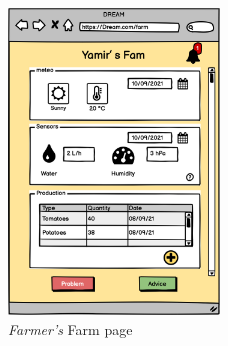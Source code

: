 \begin{figure}[H]
    \begin{center}
    \includegraphics[width=0.5\textwidth]{mockups/FFarm.png}
    \caption{\emph{Farmer's} Farm page}
    \label{fig:FarmPage}
    \end{center}
\end{figure}

